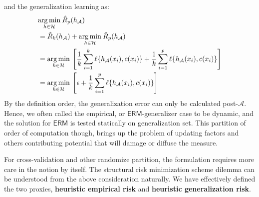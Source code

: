 and the generalization learning as: 
\begin{equation}
    \begin{split}
        &\underset{h\in \mathcal{H}}{\operatorname*{arg\,min}}\: \hat{R}_{p}(h_{\mathcal{A}}) \\
        & = \hat{R}_{k}(h_{\mathcal{A}}) + \underset{h\in \mathcal{H}}{\operatorname*{arg\,min}}\:\hat{R}_{p}(h_{\mathcal{A}})\\
        & =  \underset{h\in \mathcal{H}}{\operatorname*{arg\,min}}\: \left[\frac{1}{k} \sum^{k}_{i=1} \ell\{h_{\mathcal{A}}(x_{i}),c(x_{i})\} + \frac{1}{k} \sum^{p}_{i=1} \ell\{h_{\mathcal{A}}(x_{i}),c(x_{i})\}\right]\\
        & = \underset{h\in \mathcal{H}}{\operatorname*{arg\,min}}\: \left[\epsilon + \frac{1}{k} \sum^{p}_{i=1} \ell\{h_{\mathcal{A}}(x_{i}),c(x_{i})\}\right]
    \end{split}
\end{equation}
By the definition order, the generalization error can only be calculated post-$\mathcal{A}$. Hence, we often called the empirical, or $\mathsf{ERM}$-generalizer case to be dynamic, and the solution for $\mathsf{ERM}$ is tested statically on generalization set. This partition of order of computation though, brings up the problem of updating factors and others contributing potential that will damage or diffuse the measure. 

For cross-validation and other randomize partition, the formulation requires more care in the notion by itself. The structural risk minimization scheme dilemma can be understood from the above consideration naturally. We have effectively defined the two proxies, \textbf{heuristic empirical risk} and \textbf{heuristic generalization risk}. 